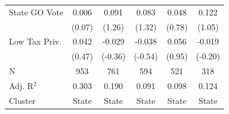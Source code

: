 \begin{tabular*}{\textwidth}{@{\extracolsep{\fill}}lccccc}
   State GO Vote        & 0.006          & 0.091          & 0.083         & 0.048         & 0.122\\   
                        & (0.07)        & (1.26)        & (1.32)       & (0.78)       & (1.05)\\   
   Low Tax Priv.        & 0.042          & -0.029         & -0.038        & 0.056         & -0.019\\   
                        & (0.47)        & (-0.36)       & (-0.54)      & (0.95)       & (-0.20)\\   
   \hline
   N         & 953            & 761            & 594           & 521           & 318\\  
   Adj. R$^2$       & 0.303          & 0.190          & 0.091         & 0.098         & 0.124\\  
   Cluster              & State & State & State & State & State\\  
   \bottomrule
\end{tabular*}
\par\endgroup

